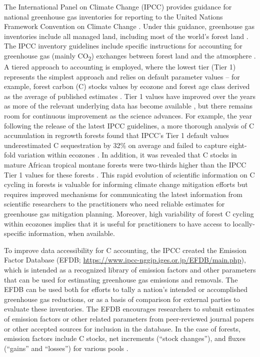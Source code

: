 \documentclass[, manuscript]{copernicus}
\begin{document}
The International Panel on Climate Change (IPCC) provides guidance for
national greenhouse gas inventories for reporting to the United Nations
Framework Convention on Climate Change
\citep[UNFCCC,][]{ipcc_2006_2006, ipcc_2019_2019}. Under this guidance,
greenhouse gas inventories include all managed land, including most of
the world's forest land \citep{ogle_delineating_2018}. The IPCC
inventory guidelines include specific instructions for accounting for
greenhouse gas (mainly CO\textsubscript{2}) exchanges between forest
land and the atmosphere \citep{ipcc_agriculture_2006, ipcc_2019_2019}. A
tiered approach to accounting is employed, where the lowest tier (Tier
1) represents the simplest approach and relies on default parameter
values -- for example, forest carbon (C) stocks values by ecozone
\citep{fao_global_2012} and forest age class derived as the average of
published estimates \citep{ipcc_2019_2019, rozendaal_aboveground_2022}.
Tier 1 values have improved over the years as more of the relevant
underlying data has become available
\citep{requenasuarez_estimating_2019, rozendaal_aboveground_2022}, but
there remains room for continuous improvement as the science advances.
For example, the year following the release of the latest IPCC
guidelines, a more thorough analysis of C accumulation in regrowth
forests found that IPCC's Tier 1 default values underestimated C
sequestration by 32\% on average and failed to capture eight-fold
variation within ecozones \citep{cook-patton_mapping_2020}. In addition,
it was revealed that C stocks in mature African tropical montane forests
were two-thirds higher than the IPCC Tier 1 values for these forests
\citep{cuni-sanchez_high_2021}. This rapid evolution of scientific
information on C cycling in forests is valuable for informing climate
change mitigation efforts but requires improved mechanisms for
communicating the latest information from scientific researchers to the
practitioners who need reliable estimates for greenhouse gas mitigation
planning. Moreover, high variability of forest C cycling within ecozones
\citep[e.g.,][]{cook-patton_mapping_2020, cuni-sanchez_high_2021}
implies that it is useful for practitioners to have access to
locally-specific information, when available.

To improve data accessibility for C accounting, the IPCC created the
Emission Factor Database (EFDB;
\url{https://www.ipcc-nggip.iges.or.jp/EFDB/main.php}), which is
intended as a recognized library of emission factors and other
parameters that can be used for estimating greenhouse gas emissions and
removals. The EFDB can be used both for efforts to tally a nation's
intended or accomplished greenhouse gas reductions, or as a basis of
comparison for external parties to evaluate these inventories. The EFDB
encourages researchers to submit estimates of emission factors or other
related parameters from peer-reviewed journal papers or other accepted
sources for inclusion in the database. In the case of forests, emission
factors include C stocks, net increments (``stock changes''), and fluxes
(``gains'' and ``losses'') for various pools
\citep{ipcc_2006_2006, ipcc_2019_2019}.
\end{document}
